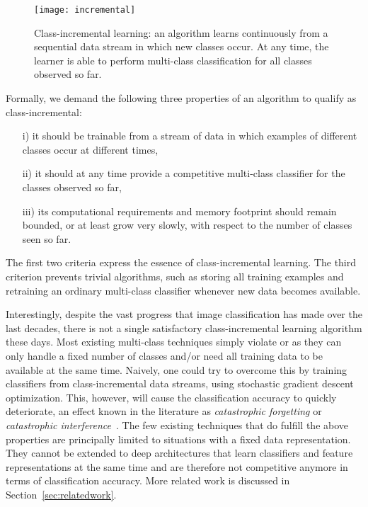 \documentclass[10pt,twocolumn,letterpaper]{article}
\begin{document}
\begin{figure}[t]\centering
\texttt{[image: incremental]}
\caption{Class-incremental learning: an algorithm learns 
continuously from a sequential data stream in which new 
classes occur. At any time, the learner is able 
to perform multi-class classification for all 
classes observed so far. 
}
\end{figure}

Formally, we demand the following three properties 
of an algorithm to qualify as class-incremental: 
\begin{itemize}[itemsep=0pt,topsep=2pt]
\item[i)] it should be trainable from a stream of data in 
which examples of different classes occur at different times,
\item[ii)] it should at any time provide a competitive 
multi-class classifier for the classes observed so far, 
\item[iii)] its computational requirements and memory 
footprint should remain bounded, or at least grow very slowly, 
with respect to the number of classes seen so far.
\end{itemize}
The first two criteria express the essence of class-incremental 
learning. The third criterion prevents trivial algorithms, 
such as storing all training examples and retraining an ordinary 
multi-class classifier whenever new data becomes available. 

Interestingly, despite the vast progress that image classification 
has made over the last decades, there is not a single satisfactory 
class-incremental learning algorithm these days. 
Most existing multi-class techniques simply violate  or  
as they can only handle a fixed number of classes and/or 
need all training data to be available at the same time. 
Naively, one could try to overcome this by training classifiers 
from class-incremental data streams, \eg using stochastic gradient 
descent optimization. This, however, will cause the classification 
accuracy to quickly deteriorate, an effect known in the literature 
as \emph{catastrophic forgetting} or 
\emph{catastrophic interference}~\cite{mccloskey1989catastrophic}. 
The few existing techniques that do fulfill the above properties are 
principally limited to situations with a fixed data representation. 
They cannot be extended to deep architectures that learn classifiers 
and feature representations at the same time and are therefore not 
competitive anymore in terms of classification accuracy. 
More related work is discussed in Section~\ref{sec:relatedwork}.
\end{document}
